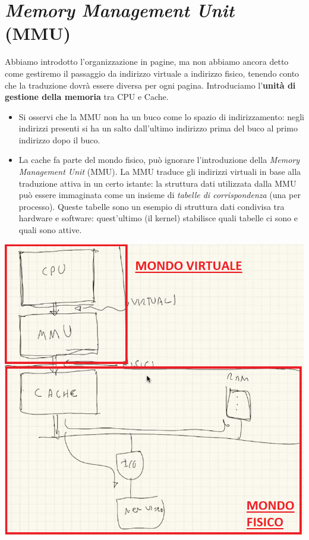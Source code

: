 \documentclass[11pt]{report}
\theoremstyle{definition}
\begin{document}
\section{\emph{Memory Management Unit} (MMU)}
Abbiamo introdotto l'organizzazione in pagine, ma non abbiamo ancora detto come gestiremo il passaggio da indirizzo virtuale a indirizzo fisico, tenendo conto che la traduzione dovrà essere diversa per ogni pagina. Introduciamo l'\textbf{unità di gestione della memoria} tra CPU e Cache.
\begin{itemize}
	\item Si osservi che la MMU non ha un buco come lo spazio di indirizzamento: negli indirizzi presenti si ha un salto dall'ultimo indirizzo prima del buco al primo indirizzo dopo il buco.
	\item La cache fa parte del mondo fisico, può ignorare l'introduzione della \emph{Memory Management Unit} (MMU). La MMU traduce gli indirizzi virtuali in base alla traduzione attiva in un certo istante: la struttura dati utilizzata dalla MMU può essere immaginata come un insieme di \textit{tabelle di corrispondenza} (una per processo). Queste tabelle sono un esempio di struttura dati condivisa tra hardware e software: quest'ultimo (il kernel) stabilisce quali tabelle ci sono e quali sono attive.
\end{itemize}
\begin{center}
\includegraphics[scale=.5]{img/213.PNG}
\end{center}
\end{document}
